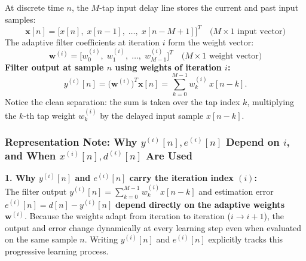 \documentclass[11pt,a4paper]{article}
\begin{document}
\noindent At discrete time $n$, the $M$-tap input delay line stores the current and past input samples:
\begin{equation}
\mathbf{x}[n] = \big[x[n],\; x[n-1],\; \dots,\; x[n-M+1]\big]^T \quad \text{($M \times 1$ input vector)}
\end{equation}
The adaptive filter coefficients at iteration $i$ form the weight vector:
\begin{equation}
\mathbf{w}^{(i)} = \big[w_0^{(i)},\; w_1^{(i)},\; \dots,\; w_{M-1}^{(i)}\big]^T \quad \text{($M \times 1$ weight vector)}
\end{equation}
\textbf{Filter output at sample $n$ using weights of iteration $i$:}
\begin{equation}
y^{(i)}[n] = \big(\mathbf{w}^{(i)}\big)^T \mathbf{x}[n] = \sum_{k=0}^{M-1} w_k^{(i)}\,x[n-k].
\end{equation}
Notice the clean separation: the sum is taken over the tap index $k$, multiplying the $k$-th tap weight $w_k^{(i)}$ by the delayed input sample $x[n-k]$.

\subsubsection*{Representation Note: Why $y^{(i)}[n], e^{(i)}[n]$ Depend on $i$, and When $x^{(i)}[n], d^{(i)}[n]$ Are Used}

\noindent\textbf{1. Why $y^{(i)}[n]$ and $e^{(i)}[n]$ carry the iteration index $(i)$:} \\
The filter output $y^{(i)}[n] = \sum_{k=0}^{M-1} w_k^{(i)} x[n-k]$ and estimation error $e^{(i)}[n] = d[n] - y^{(i)}[n]$ \textbf{depend directly on the adaptive weights $\mathbf{w}^{(i)}$}. Because the weights adapt from iteration to iteration ($i \to i+1$), the output and error change dynamically at every learning step even when evaluated on the same sample $n$. Writing $y^{(i)}[n]$ and $e^{(i)}[n]$ explicitly tracks this progressive learning process.
\end{document}
